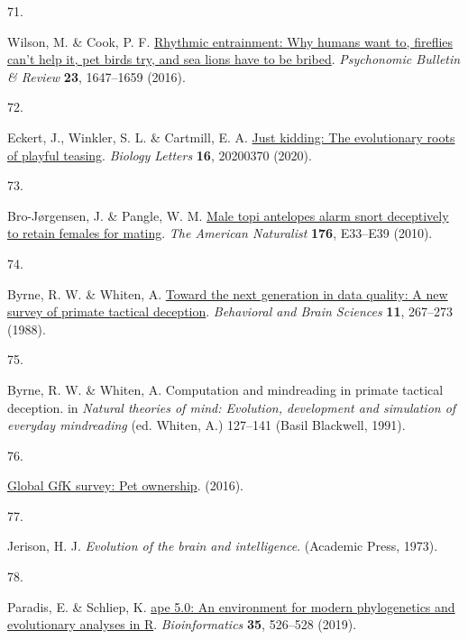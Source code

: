\documentclass[
  man,floatsintext]{apa6}
\newlength{\cslhangindent}
\newlength{\csllabelwidth}
\newlength{\cslentryspacingunit} %
\newenvironment{CSLReferences}[2] %
 {%
  \setlength{\parindent}{0pt}
  \ifodd #1
  \let\oldpar\par
  \def\par{\hangindent=\cslhangindent\oldpar}
  \fi
  \setlength{\parskip}{#2\cslentryspacingunit}
 }%
 {}
\newcommand{\CSLLeftMargin}[1]{\parbox[t]{\csllabelwidth}{#1}}
\newcommand{\CSLRightInline}[1]{\parbox[t]{\linewidth - \csllabelwidth}{#1}\break}
\begin{document}
\begin{CSLReferences}{0}{0}
\leavevmode{}%
\CSLLeftMargin{71. }%
\CSLRightInline{Wilson, M. \& Cook, P. F. \href{https://doi.org/10.3758/s13423-016-1013-x}{Rhythmic entrainment: Why humans want to, fireflies can't help it, pet birds try, and sea lions have to be bribed}. \emph{Psychonomic Bulletin \& Review} \textbf{23}, 1647--1659 (2016).}

\leavevmode{}%
\CSLLeftMargin{72. }%
\CSLRightInline{Eckert, J., Winkler, S. L. \& Cartmill, E. A. \href{https://doi.org/10.1098/rsbl.2020.0370}{Just kidding: The evolutionary roots of playful teasing}. \emph{Biology Letters} \textbf{16}, 20200370 (2020).}

\leavevmode{}%
\CSLLeftMargin{73. }%
\CSLRightInline{Bro-Jørgensen, J. \& Pangle, W. M. \href{https://doi.org/10.1086/653078}{Male topi antelopes alarm snort deceptively to retain females for mating}. \emph{The American Naturalist} \textbf{176}, E33--E39 (2010).}

\leavevmode{}%
\CSLLeftMargin{74. }%
\CSLRightInline{Byrne, R. W. \& Whiten, A. \href{https://doi.org/10.1017/S0140525X00049955}{Toward the next generation in data quality: A new survey of primate tactical deception}. \emph{Behavioral and Brain Sciences} \textbf{11}, 267--273 (1988).}

\leavevmode{}%
\CSLLeftMargin{75. }%
\CSLRightInline{Byrne, R. W. \& Whiten, A. Computation and mindreading in primate tactical deception. in \emph{Natural theories of mind: Evolution, development and simulation of everyday mindreading} (ed. Whiten, A.) 127--141 (Basil Blackwell, 1991).}

\leavevmode{}%
\CSLLeftMargin{76. }%
\CSLRightInline{\href{http://www.gfk.com/global-studies/global-studies-pet-ownership}{Global GfK survey: Pet ownership}. (2016).}

\leavevmode{}%
\CSLLeftMargin{77. }%
\CSLRightInline{Jerison, H. J. \emph{Evolution of the brain and intelligence}. (Academic Press, 1973).}

\leavevmode{}%
\CSLLeftMargin{78. }%
\CSLRightInline{Paradis, E. \& Schliep, K. \href{https://doi.org/10.1093/bioinformatics/bty633}{{ape} 5.0: An environment for modern phylogenetics and evolutionary analyses in {R}}. \emph{Bioinformatics} \textbf{35}, 526--528 (2019).}


\end{CSLReferences}
\end{document}
